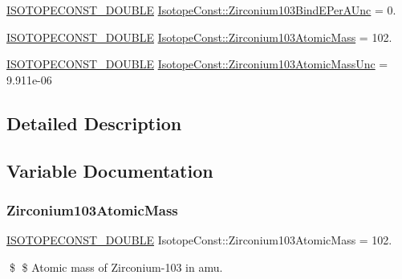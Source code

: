 \begin{DoxyCompactItemize}
\mbox{\hyperlink{group___isotope_const-_macros_ga8f45a7272ce02c0b4c65c44636ed719a}{I\+S\+O\+T\+O\+P\+E\+C\+O\+N\+S\+T\+\_\+\+D\+O\+U\+B\+LE}} \mbox{\hyperlink{group___isotope_const-_zirconium-_zr103_gab8d7dd99cc0bf285648cc73eb73d808d}{Isotope\+Const\+::\+Zirconium103\+Bind\+E\+Per\+A\+Unc}} = 0.
\item 
\mbox{\hyperlink{group___isotope_const-_macros_ga8f45a7272ce02c0b4c65c44636ed719a}{I\+S\+O\+T\+O\+P\+E\+C\+O\+N\+S\+T\+\_\+\+D\+O\+U\+B\+LE}} \mbox{\hyperlink{group___isotope_const-_zirconium-_zr103_ga157c6b3b19b5472ae1315517081e909f}{Isotope\+Const\+::\+Zirconium103\+Atomic\+Mass}} = 102.
\item 
\mbox{\hyperlink{group___isotope_const-_macros_ga8f45a7272ce02c0b4c65c44636ed719a}{I\+S\+O\+T\+O\+P\+E\+C\+O\+N\+S\+T\+\_\+\+D\+O\+U\+B\+LE}} \mbox{\hyperlink{group___isotope_const-_zirconium-_zr103_gad22ff615bf91e4044dfa64aaa9d4b318}{Isotope\+Const\+::\+Zirconium103\+Atomic\+Mass\+Unc}} = 9.\+911e-\/06
\end{DoxyCompactItemize}


\subsection{Detailed Description}


\subsection{Variable Documentation}
\mbox{\label{group___isotope_const-_zirconium-_zr103_ga157c6b3b19b5472ae1315517081e909f}} 
\subsubsection{\texorpdfstring{Zirconium103\+Atomic\+Mass}{Zirconium103AtomicMass}}
{\footnotesize\ttfamily \mbox{\hyperlink{group___isotope_const-_macros_ga8f45a7272ce02c0b4c65c44636ed719a}{I\+S\+O\+T\+O\+P\+E\+C\+O\+N\+S\+T\+\_\+\+D\+O\+U\+B\+LE}} Isotope\+Const\+::\+Zirconium103\+Atomic\+Mass = 102.}

\$ \$ Atomic mass of Zirconium-\/103 in amu. \mbox{\label{group___isotope_const-_zirconium-_zr103_gad22ff615bf91e4044dfa64aaa9d4b318}} 
